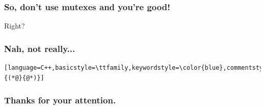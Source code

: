 \documentclass{beamer}
\begin{document}
\begin{frame}[fragile]

\frametitle{So, don't use mutexes and you're good!}

Right?

\end{frame}

\begin{frame}[fragile]

\frametitle{Nah, not really...}

\begin{lstlisting}[language=C++,basicstyle=\ttfamily,keywordstyle=\color{blue},commentstyle=\color{teal}\itshape,showstringspaces=false,escapeinside={(*@}{@*)}]

\end{lstlisting}

\end{frame}


\begin{frame}
  \frametitle{Thanks for your attention.}
\end{frame}
\end{document}
